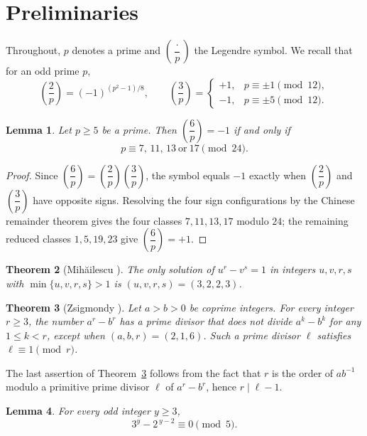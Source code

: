 \documentclass[preprint,12pt]{elsarticle}
\newtheorem{theorem}{Theorem}[section]
\newtheorem{lemma}[theorem]{Lemma}
\theoremstyle{definition}
\newcommand{\leg}[2]{\left(\dfrac{#1}{#2}\right)}
\begin{document}
\section{Preliminaries}\label{sec:prelim}

Throughout, $p$ denotes a prime and $\leg{\cdot}{p}$ the Legendre symbol. We
recall that for an odd prime $p$,
\[
\leg{2}{p}=(-1)^{(p^{2}-1)/8},
\qquad
\leg{3}{p}=
\begin{cases}
+1, & p\equiv \pm 1 \pmod{12},\\
-1, & p\equiv \pm 5 \pmod{12}.
\end{cases}
\]

\begin{lemma}\label{lem:classes}
Let $p\geq 5$ be a prime. Then $\leg{6}{p}=-1$ if and only if
\[
p\equiv 7,\,11,\,13 \ \text{or}\ 17 \pmod{24}.
\]
\end{lemma}

\begin{proof}
Since $\leg{6}{p}=\leg{2}{p}\leg{3}{p}$, the symbol equals $-1$ exactly when
$\leg{2}{p}$ and $\leg{3}{p}$ have opposite signs. Resolving the four sign
configurations by the Chinese remainder theorem gives the four classes
$7,11,13,17$ modulo $24$; the remaining reduced classes $1,5,19,23$ give
$\leg{6}{p}=+1$.
\end{proof}

\begin{theorem}[Mih\u{a}ilescu \cite{Mihailescu2004}]\label{thm:catalan}
The only solution of $u^{r}-v^{s}=1$ in integers $u,v,r,s$ with
$\min\{u,v,r,s\}>1$ is $(u,v,r,s)=(3,2,2,3)$.
\end{theorem}

\begin{theorem}[Zsigmondy \cite{Zsigmondy1892}]\label{thm:zsigmondy}
Let $a>b>0$ be coprime integers. For every integer $r\geq 3$, the number
$a^{r}-b^{r}$ has a prime divisor that does not divide $a^{k}-b^{k}$ for any
$1\leq k<r$, except when $(a,b,r)=(2,1,6)$. Such a prime divisor $\ell$
satisfies $\ell\equiv 1\pmod r$.
\end{theorem}

The last assertion of Theorem~\ref{thm:zsigmondy} follows from the fact that
$r$ is the order of $ab^{-1}$ modulo a primitive prime divisor $\ell$ of
$a^{r}-b^{r}$, hence $r\mid\ell-1$.

\begin{lemma}\label{lem:mod5}
For every odd integer $y\geq 3$,
\[
3^{y}-2^{\,y-2}\equiv 0 \pmod{5}.
\]
\end{lemma}
\end{document}
